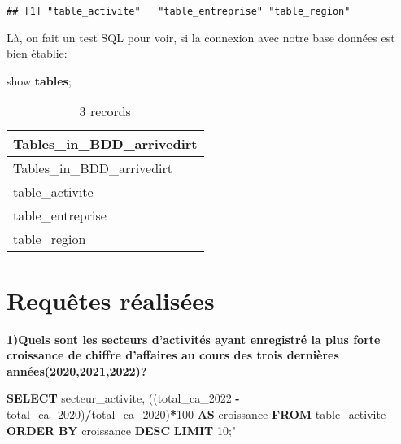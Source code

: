 \documentclass[mstat,12pt]{unswthesis}
\newenvironment{Shaded}{\begin{snugshade}}{\end{snugshade}}
\newcommand{\DecValTok}[1]{\textcolor[rgb]{0.00,0.00,0.81}{#1}}
\newcommand{\KeywordTok}[1]{\textcolor[rgb]{0.13,0.29,0.53}{\textbf{#1}}}
\newcommand{\NormalTok}[1]{#1}
\newcommand{\OperatorTok}[1]{\textcolor[rgb]{0.81,0.36,0.00}{\textbf{#1}}}
\newcommand{\OtherTok}[1]{\textcolor[rgb]{0.56,0.35,0.01}{#1}}
\begin{document}
\begin{verbatim}
## [1] "table_activite"   "table_entreprise" "table_region"
\end{verbatim}

\bigskip

Là, on fait un test SQL pour voir, si la connexion avec notre base
données est bien établie:

\begin{Shaded}
\begin{Highlighting}[]
\NormalTok{show }\KeywordTok{tables}\NormalTok{; }
\end{Highlighting}
\end{Shaded}

\begin{longtable}[]{@{}l@{}}
\caption{3 records}\tabularnewline
\toprule()
Tables\_in\_BDD\_arrivedirt \\
\midrule()
\endfirsthead
\toprule()
Tables\_in\_BDD\_arrivedirt \\
\midrule()
\endhead
table\_activite \\
table\_entreprise \\
table\_region \\
\bottomrule()
\end{longtable}

\hypertarget{requuxeates-ruxe9alisuxe9es}{%
\section{Requêtes réalisées}\label{requuxeates-ruxe9alisuxe9es}}

\large
\enspace

\textbf{1)Quels sont les secteurs d'activités ayant enregistré la plus
forte croissance de chiffre d'affaires au cours des trois dernières
années(2020,2021,2022)?}

\bigskip

\begin{Shaded}
\begin{Highlighting}[]
\KeywordTok{SELECT}\NormalTok{ secteur\_activite,}
\NormalTok{((total\_ca\_2022 }\OperatorTok{{-}}\NormalTok{ total\_ca\_2020)}\OperatorTok{/}\NormalTok{total\_ca\_2020)}\OperatorTok{*}\DecValTok{100} \KeywordTok{AS}\NormalTok{ croissance}
\KeywordTok{FROM}\NormalTok{ table\_activite}
\KeywordTok{ORDER} \KeywordTok{BY}\NormalTok{ croissance }\KeywordTok{DESC}
\KeywordTok{LIMIT} \DecValTok{10}\NormalTok{;}\OtherTok{"}
\end{Highlighting}
\end{Shaded}
\end{document}
